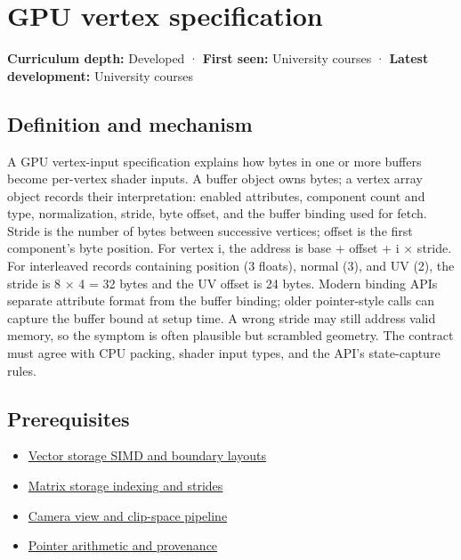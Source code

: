 \hypertarget{appendix-749ba51a6c25}{}\label{referencestart:appendix-749ba51a6c25}
\section{GPU vertex specification}\label{appendix-749ba51a6c25-gpu-vertex-specification}

\textbf{Curriculum depth:} Developed · \textbf{First seen:} University courses · \textbf{Latest development:} University courses

\subsection{Definition and mechanism}\label{appendix-749ba51a6c25-definition-and-mechanism}

A GPU vertex-input specification explains how bytes in one or more buffers become per-vertex shader inputs. A buffer object owns bytes; a vertex array object records their interpretation: enabled attributes, component count and type, normalization, stride, byte offset, and the buffer binding used for fetch. Stride is the number of bytes between successive vertices; offset is the first component's byte position. For vertex i, the address is base + offset + i × stride. For interleaved records containing position (3 floats), normal (3), and UV (2), the stride is 8 × 4 = 32 bytes and the UV offset is 24 bytes. Modern binding APIs separate attribute format from the buffer binding; older pointer-style calls can capture the buffer bound at setup time. A wrong stride may still address valid memory, so the symptom is often plausible but scrambled geometry. The contract must agree with CPU packing, shader input types, and the API's state-capture rules.

\subsection{Prerequisites}\label{appendix-749ba51a6c25-prerequisites}

\begin{itemize}
\tightlist
\item
  \hyperref[appendix-26bf6bf2fb8b]{Vector storage SIMD and boundary layouts}
\item
  \hyperref[appendix-ffdc1d4e5350]{Matrix storage indexing and strides}
\item
  \hyperref[appendix-1c07d64f5e70]{Camera view and clip-space pipeline}
\item
  \hyperref[appendix-6af5921bc853]{Pointer arithmetic and provenance}
\end{itemize}

